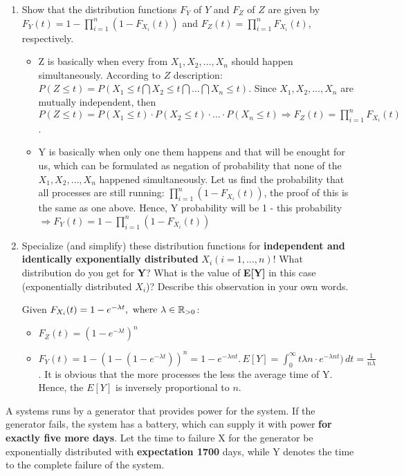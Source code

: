 \documentclass{homework}
\begin{document}
\begin{enumerate}[label=(\alph*)]
	\item Show that the distribution functions $F_Y$ of $Y$ and $F_Z$ of $Z$ are given by \newline $F_Y(t) = 1 - \prod_{i=1}^{n} (1 - F_{X_i}(t))$ and $F_Z(t) = \prod_{i=1}^{n} F_{X_i}(t)$, respectively.
	\begin{itemize}
		\item Z is basically when every from $X_1, X_2,\dots,X_n$ should happen simultaneously. According to $Z$ description: $P(Z\leq t) = P(X_1\leq t \bigcap X_2\leq t \bigcap \dots \bigcap X_n\leq t)$. Since $X_1, X_2,\dots,X_n$ are mutually independent, then \newline $P(Z\leq t) = P(X_1\leq t)\cdot P(X_2\leq t) \cdot \dots \cdot P(X_n\leq t) \Rightarrow F_Z(t) = \prod_{i=1}^{n} F_{X_i}(t)$.
		\item Y is basically when only one them happens and that will be enought for us, which can be formulated as negation of probability that none of the $X_1, X_2,\dots,X_n$ happened simultaneously. Let us find the probability that all processes are still running: $\prod_{i=1}^{n} (1 - F_{X_i}(t))$, the proof of this is the same as one above. Hence, Y probability will be 1 - this probability $\Rightarrow F_Y(t) = 1 - \prod_{i=1}^{n} (1 - F_{X_i}(t))$
	\end{itemize}
	\item Specialize (and simplify) these distribution functions for \textbf{independent and identically exponentially distributed} $X_i (i=1,\dots,n)$!
What distribution do you get for \textbf{Y}? What is the value of \textbf{E[Y]} in this case (exponentially distributed $X_i$)? Describe this observation in your own words.

	Given $F_{X_i}(t) = 1 - e^{-\lambda t}, \text{ where } \lambda \in \mathbb R_{>0}$:
	\begin{itemize}
		\item $F_Z(t) = (1 - e^{-\lambda t})^n$
		\item $F_Y(t) = 1 - (1 - (1 - e^{-\lambda t}))^n = 1 - e^{-\lambda n t}.\, E[Y] = \int_0^\infty t\lambda n\cdot e^{-\lambda n t})\,dt = \frac{1}{n\lambda}$.
			\newline It is obvious that the more processes the less the average time of Y. Hence, the $E[Y]$ is inversely proportional to $n$.
	\end{itemize}
\end{enumerate}
\exercise*
A systems runs by a generator that provides power for the system. If the generator fails, the system has a battery, which can supply it with power \textbf{for exactly five more days}. Let the time to failure X for the generator be exponentially distributed with \textbf{expectation 1700} days, while Y denotes the time to the complete failure of the system.
\end{document}
